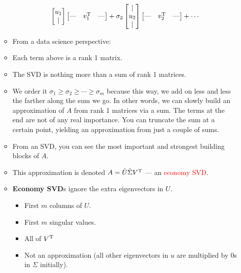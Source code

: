 \documentclass{article}
\begin{document}
\begin{itemize}
\begin{itemize}
\begin{align*}
\begin{bmatrix}
                u_1\\
                |\\
            \end{bmatrix}
            \begin{bmatrix}
                \text{---} & v_1^{\text{T}} & \text{---}
            \end{bmatrix}
            +
            \sigma_2
            \begin{bmatrix}
                |\\
                u_2\\
                |\\
            \end{bmatrix}
            \begin{bmatrix}
                \text{---} & v_2^{\text{T}} & \text{---}
            \end{bmatrix}
            +\cdots
        \end{align*}
        \item From a data science perspective:
        \item Each term above is a rank 1 matrix.
        \item The SVD is nothing more than a sum of rank 1 matrices.
        \item We order it $\sigma_1\geq\sigma_2\geq\cdots\geq\sigma_m$ because this way, we add on less and less the farther along the sum we go. In other words, we can slowly build an approximation of $A$ from rank 1 matrices via a sum. The terms at the end are not of any real importance. You can truncate the sum at a certain point, yielding an approximation from just a couple of sums.
        \item From an SVD, you can see the most important and strongest building blocks of $A$.
        \item This approximation is denoted $A= \hat{U}\hat{\Sigma}V^{\text{T}}$ --- an \textcolor{red}{economy SVD}.
        \item \textbf{Economy SVD}s ignore the extra eigenvectors in $U$.
        \begin{itemize}
            \item First $m$ columns of $U$.
            \item First $m$ singular values.
            \item All of $V^{\text{T}}$
            \item Not an approximation (all other eigenvectors in $u$ are multiplied by 0s in $\Sigma$ initially).
        \end{itemize}

\end{itemize}
\end{itemize}
\end{document}
